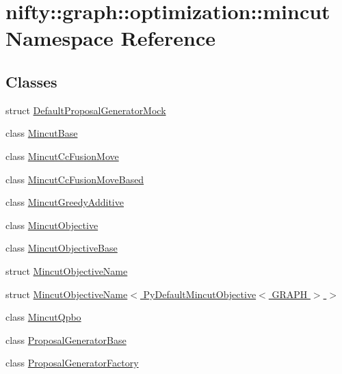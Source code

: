 \hypertarget{namespacenifty_1_1graph_1_1optimization_1_1mincut}{}\section{nifty\+:\+:graph\+:\+:optimization\+:\+:mincut Namespace Reference}
\label{namespacenifty_1_1graph_1_1optimization_1_1mincut}
\subsection*{Classes}
\begin{DoxyCompactItemize}
\item 
struct \hyperlink{structnifty_1_1graph_1_1optimization_1_1mincut_1_1DefaultProposalGeneratorMock}{Default\+Proposal\+Generator\+Mock}
\item 
class \hyperlink{classnifty_1_1graph_1_1optimization_1_1mincut_1_1MincutBase}{Mincut\+Base}
\item 
class \hyperlink{classnifty_1_1graph_1_1optimization_1_1mincut_1_1MincutCcFusionMove}{Mincut\+Cc\+Fusion\+Move}
\item 
class \hyperlink{classnifty_1_1graph_1_1optimization_1_1mincut_1_1MincutCcFusionMoveBased}{Mincut\+Cc\+Fusion\+Move\+Based}
\item 
class \hyperlink{classnifty_1_1graph_1_1optimization_1_1mincut_1_1MincutGreedyAdditive}{Mincut\+Greedy\+Additive}
\item 
class \hyperlink{classnifty_1_1graph_1_1optimization_1_1mincut_1_1MincutObjective}{Mincut\+Objective}
\item 
class \hyperlink{classnifty_1_1graph_1_1optimization_1_1mincut_1_1MincutObjectiveBase}{Mincut\+Objective\+Base}
\item 
struct \hyperlink{structnifty_1_1graph_1_1optimization_1_1mincut_1_1MincutObjectiveName}{Mincut\+Objective\+Name}
\item 
struct \hyperlink{structnifty_1_1graph_1_1optimization_1_1mincut_1_1MincutObjectiveName_3_01PyDefaultMincutObjective_3_01GRAPH_01_4_01_4}{Mincut\+Objective\+Name$<$ Py\+Default\+Mincut\+Objective$<$ G\+R\+A\+P\+H $>$ $>$}
\item 
class \hyperlink{classnifty_1_1graph_1_1optimization_1_1mincut_1_1MincutQpbo}{Mincut\+Qpbo}
\item 
class \hyperlink{classnifty_1_1graph_1_1optimization_1_1mincut_1_1ProposalGeneratorBase}{Proposal\+Generator\+Base}
\item 
class \hyperlink{classnifty_1_1graph_1_1optimization_1_1mincut_1_1ProposalGeneratorFactory}{Proposal\+Generator\+Factory}

\end{DoxyCompactItemize}
